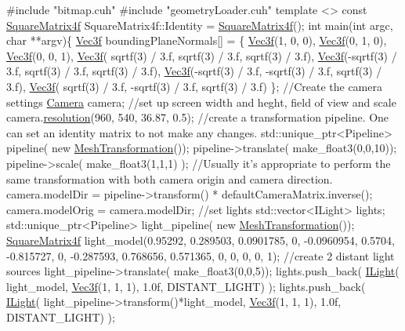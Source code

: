 \begin{DoxyCode}
\textcolor{preprocessor}{#include "bitmap.cuh"}
\textcolor{preprocessor}{#include "geometryLoader.cuh"}
\textcolor{keyword}{template} <> \textcolor{keyword}{const} \hyperlink{class_square_matrix4}{SquareMatrix4f} SquareMatrix4f::Identity = 
      \hyperlink{class_square_matrix4}{SquareMatrix4f}();
\textcolor{keywordtype}{int} main(\textcolor{keywordtype}{int} argc, \textcolor{keywordtype}{char} **argv)\{
    \hyperlink{class_vec3}{Vec3f} boundingPlaneNormals[] = \{
            \hyperlink{class_vec3}{Vec3f}(1, 0, 0),
            \hyperlink{class_vec3}{Vec3f}(0, 1, 0),
            \hyperlink{class_vec3}{Vec3f}(0, 0, 1),
            \hyperlink{class_vec3}{Vec3f}( sqrtf(3) / 3.f,  sqrtf(3) / 3.f, sqrtf(3) / 3.f),
            \hyperlink{class_vec3}{Vec3f}(-sqrtf(3) / 3.f,  sqrtf(3) / 3.f, sqrtf(3) / 3.f),
            \hyperlink{class_vec3}{Vec3f}(-sqrtf(3) / 3.f, -sqrtf(3) / 3.f, sqrtf(3) / 3.f),
            \hyperlink{class_vec3}{Vec3f}( sqrtf(3) / 3.f, -sqrtf(3) / 3.f, sqrtf(3) / 3.f) \};
        \textcolor{comment}{//Create the camera settings}
        \hyperlink{struct_camera}{Camera} camera;
        \textcolor{comment}{//set up screen width and heght, field of view and scale}
        camera.\hyperlink{struct_camera_ab0cbf1b102afdeb285ef2be271d1701c}{resolution}(960, 540, 36.87, 0.5);
        \textcolor{comment}{//create a transformation pipeline. One can set an identity matrix to not make any changes.}
        std::unique\_ptr<Pipeline> pipeline( \textcolor{keyword}{new} \hyperlink{class_mesh_transformation}{MeshTransformation}());
        pipeline->translate( make\_float3(0,0,10));
        pipeline->scale( make\_float3(1,1,1) );
        \textcolor{comment}{//Usually it's appropriate to perform the same transformation with both camera origin and camera
       direction.}
        camera.modelDir = pipeline->transform() * defaultCameraMatrix.inverse();
        camera.modelOrig = camera.modelDir;
        \textcolor{comment}{//set lights}
        std::vector<ILight> lights;
        std::unique\_ptr<Pipeline> light\_pipeline( \textcolor{keyword}{new} \hyperlink{class_mesh_transformation}{MeshTransformation}());
        \hyperlink{class_square_matrix4}{SquareMatrix4f} light\_model(0.95292, 0.289503, 0.0901785, 0,
                      -0.0960954, 0.5704, -0.815727, 0,
                      -0.287593, 0.768656, 0.571365, 0,
                    0, 0, 0, 1);
        \textcolor{comment}{//create 2 distant light sources}
        light\_pipeline->translate( make\_float3(0,0,5));
        lights.push\_back( \hyperlink{class_i_light}{ILight}( light\_model, \hyperlink{class_vec3}{Vec3f}(1, 1, 1), 1.0f, DISTANT\_LIGHT) );
        lights.push\_back( \hyperlink{class_i_light}{ILight}( light\_pipeline->transform()*light\_model, 
      \hyperlink{class_vec3}{Vec3f}(1, 1, 1), 1.0f, DISTANT\_LIGHT) );


\end{DoxyCode}
